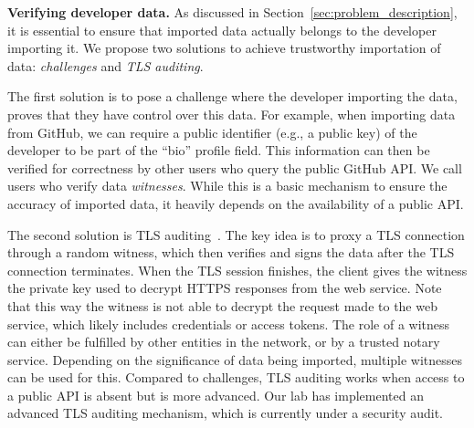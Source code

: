 \textbf{Verifying developer data.}
As discussed in Section~\ref{sec:problem_description}, it is essential to ensure that imported data actually belongs to the developer importing it.
We propose two solutions to achieve trustworthy importation of data: \textit{challenges} and \textit{TLS auditing}.

The first solution is to pose a challenge where the developer importing the data, proves that they have control over this data.
For example, when importing data from GitHub, we can require a public identifier (e.g., a public key) of the developer to be part of the \enquote{bio} profile field.
This information can then be verified for correctness by other users who query the public GitHub API.
We call users who verify data \emph{witnesses}.
While this is a basic mechanism to ensure the accuracy of imported data, it heavily depends on the availability of a public API.

The second solution is TLS auditing~\cite{tlsnotary2014whitepaper}.
The key idea is to proxy a TLS connection through a random witness, which then verifies and signs the data after the TLS connection terminates.
When the TLS session finishes, the client gives the witness the private key used to decrypt HTTPS responses from the web service.
Note that this way the witness is not able to decrypt the request made to the web service, which likely includes credentials or access tokens.
The role of a witness can either be fulfilled by other entities in the network, or by a trusted notary service.
Depending on the significance of data being imported, multiple witnesses can be used for this.
Compared to challenges, TLS auditing works when access to a public API is absent but is more advanced.
Our lab has implemented an advanced TLS auditing mechanism, which is currently under a security audit.

